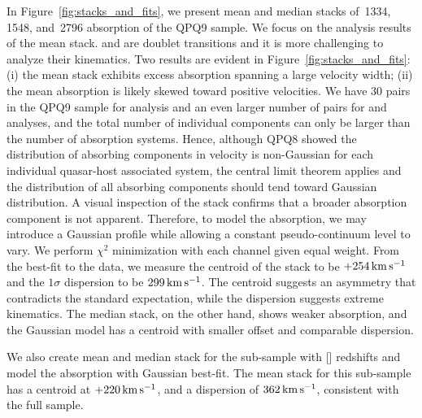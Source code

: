 \documentclass[iop]{emulateapj}
\begin{document}
In Figure~\ref{fig:stacks_and_fits}, we present mean and median stacks of \,1334, 
\,1548, and \,2796 absorption of the QPQ9 sample. We focus on the 
analysis results of the  mean stack.  and  are doublet transitions 
and it is more challenging to analyze their kinematics.
Two results are evident in Figure~\ref{fig:stacks_and_fits}: (i) the mean  stack 
exhibits excess absorption spanning a large velocity width; (ii) the mean absorption is likely 
skewed toward positive velocities. We have 30 pairs in the QPQ9 sample for  analysis
and an even larger number of pairs for  and  analyses, and the total number
of individual components can only be larger than the number of absorption systems. Hence, although
QPQ8 showed the distribution of absorbing components in velocity is non-Gaussian for each
individual quasar-host associated system, the central limit theorem applies and the distribution
of all absorbing components should tend toward Gaussian distribution. A visual inspection of the 
stack confirms that a broader absorption component is not apparent. Therefore, to model the 
absorption, we may introduce a Gaussian profile while allowing a constant pseudo-continuum level 
to vary. We perform $\chi^2$ minimization with each channel given equal weight. From the best-fit 
to the data, we measure the centroid of the  stack to be $+254\,{\rm km\,s^{-1}}$ and 
the $1\sigma$ dispersion to be $299\,{\rm km\,s^{-1}}$. The centroid suggests an asymmetry that 
contradicts the standard expectation, while the dispersion suggests extreme kinematics. The median 
stack, on the other hand, shows weaker absorption, and the Gaussian model has a centroid with 
smaller offset and comparable dispersion. 

We also create mean and median stack for the sub-sample with [] redshifts and model the 
absorption with Gaussian best-fit. The  mean stack for this sub-sample has a centroid at 
$+220\,{\rm km\,s^{-1}}$, and a dispersion of $362\,{\rm km\,s^{-1}}$, consistent with the full 
sample. 
\end{document}
